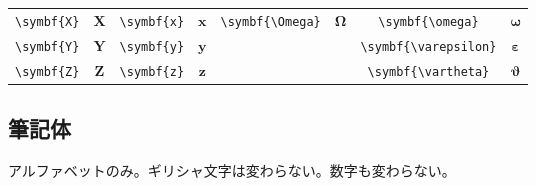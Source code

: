 \begin{longtable}{cccccccc}
    \verb|\symbf{X}| & \(\symbf{X}\) & \verb|\symbf{x}| & \(\symbf{x}\) & \verb|\symbf{\Omega}|   & \(\symbf{\Omega}\)   & \verb|\symbf{\omega}|      & \(\symbf{\omega}\)      \\
    \verb|\symbf{Y}| & \(\symbf{Y}\) & \verb|\symbf{y}| & \(\symbf{y}\) &                         &                      & \verb|\symbf{\varepsilon}| & \(\symbf{\varepsilon}\) \\
    \verb|\symbf{Z}| & \(\symbf{Z}\) & \verb|\symbf{z}| & \(\symbf{z}\) &                         &                      & \verb|\symbf{\vartheta}|   & \(\symbf{\vartheta}\)   \\
    \bottomrule
\end{longtable}

\subsection{筆記体}

アルファベットのみ。ギリシャ文字は変わらない。数字も変わらない。

